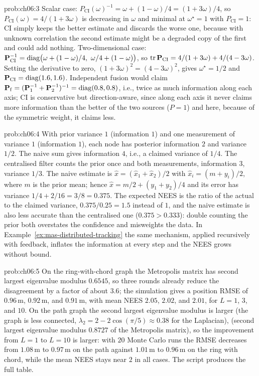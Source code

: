 \begin{sol}{prob:ch06:3}
Scalar case: $P_{\mathrm{CI}}(\omega)^{-1}=\omega+(1-\omega)/4=(1+3\omega)/4$, so $P_{\mathrm{CI}}(\omega)=4/(1+3\omega)$ is decreasing in $\omega$ and minimal at $\omega^{\star}=1$ with $P_{\mathrm{CI}}=1$: CI simply keeps the better estimate and discards the worse one, because with unknown correlation the second estimate might be a degraded copy of the first and could add nothing. Two-dimensional case: $\mathbf{P}_{\mathrm{CI}}^{-1}=\diag\!\big(\omega+(1-\omega)/4,\ \omega/4+(1-\omega)\big)$, so $\operatorname{tr}\mathbf{P}_{\mathrm{CI}}=4/(1+3\omega)+4/(4-3\omega)$. Setting the derivative to zero, $(1+3\omega)^{2}=(4-3\omega)^{2}$, gives $\omega^{\star}=1/2$ and $\mathbf{P}_{\mathrm{CI}}=\operatorname{diag}(1.6,1.6)$. Independent fusion would claim $\mathbf{P}_{\mathrm{f}}=(\mathbf{P}_1^{-1}+\mathbf{P}_2^{-1})^{-1}=\operatorname{diag}(0.8,0.8)$, i.e., twice as much information along each axis; CI is conservative but direction-aware, since along each axis it never claims more information than the better of the two sources ($P=1$) and here, because of the symmetric weight, it claims less.
\end{sol}

\begin{sol}{prob:ch06:4}
With prior variance $1$ (information $1$) and one measurement of variance $1$ (information $1$), each node has posterior information $2$ and variance $1/2$. The naive sum gives information $4$, i.e., a claimed variance of $1/4$. The centralised filter counts the prior once and both measurements, information $3$, variance $1/3$. The naive estimate is $\widehat{x}=(\widehat{x}_1+\widehat{x}_2)/2$ with $\widehat{x}_i=(m+y_i)/2$, where $m$ is the prior mean; hence $\widehat{x}=m/2+(y_1+y_2)/4$ and its error has variance $1/4+2/16=3/8=0.375$. The expected NEES is the ratio of the actual to the claimed variance, $0.375/0.25=1.5$ instead of $1$, and the naive estimate is also less accurate than the centralised one ($0.375>0.333$): double counting the prior both overstates the confidence and misweights the data. In Example~\ref{ex:mas-distributed-tracking} the same mechanism, applied recursively with feedback, inflates the information at every step and the NEES grows without bound.
\end{sol}

\begin{sol}{prob:ch06:5}
On the ring-with-chord graph the Metropolis matrix has second largest eigenvalue modulus $0.6545$, so three rounds already reduce the disagreement by a factor of about $3.6$; the simulation gives a position RMSE of $0.96$\,m, $0.92$\,m, and $0.91$\,m, with mean NEES $2.05$, $2.02$, and $2.01$, for $L=1$, $3$, and $10$. On the path graph the second largest eigenvalue modulus is larger (the graph is less connected, $\lambda_2=2-2\cos(\pi/5)\approx0.38$ for the Laplacian), (second largest eigenvalue modulus $0.8727$ of the Metropolis matrix), so the improvement from $L=1$ to $L=10$ is larger: with $20$ Monte Carlo runs the RMSE decreases from $1.08$\,m to $0.97$\,m on the path against $1.01$\,m to $0.96$\,m on the ring with chord, while the mean NEES stays near $2$ in all cases. The script  produces the full table.
\end{sol}

